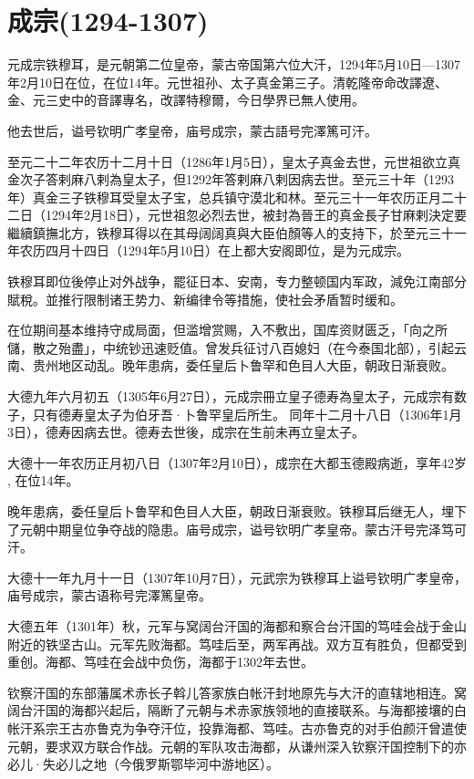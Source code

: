 
\section{成宗\tiny(1294-1307)}

元成宗铁穆耳，是元朝第二位皇帝，蒙古帝国第六位大汗，1294年5月10日—1307年2月10日在位，在位14年。元世祖孙、太子真金第三子。清乾隆帝命改譯遼、金、元三史中的音譯專名，改譯特穆爾，今日學界已無人使用。

他去世后，谥号钦明广孝皇帝，庙号成宗，蒙古語号完澤篤可汗。

至元二十二年农历十二月十日（1286年1月5日），皇太子真金去世，元世祖欲立真金次子答剌麻八剌為皇太子，但1292年答剌麻八剌因病去世。至元三十年（1293年）真金三子铁穆耳受皇太子宝，总兵镇守漠北和林。至元三十一年农历正月二十二日（1294年2月18日），元世祖忽必烈去世，被封為晉王的真金長子甘麻剌決定要繼續鎮撫北方，铁穆耳得以在其母阔阔真與大臣伯顏等人的支持下，於至元三十一年农历四月十四日（1294年5月10日）在上都大安阁即位，是为元成宗。

铁穆耳即位後停止对外战争，罷征日本、安南，专力整顿国内军政，減免江南部分賦稅。並推行限制诸王势力、新编律令等措施，使社会矛盾暂时缓和。

在位期间基本维持守成局面，但滥增赏赐，入不敷出，国库资财匮乏，「向之所儲，散之殆盡」，中统钞迅速贬值。曾发兵征讨八百媳妇（在今泰国北部），引起云南、贵州地区动乱。晚年患病，委任皇后卜鲁罕和色目人大臣，朝政日渐衰败。

大德九年六月初五（1305年6月27日），元成宗冊立皇子德寿為皇太子，元成宗有数子，只有德寿皇太子为伯牙吾·卜鲁罕皇后所生。 同年十二月十八日（1306年1月3日），德寿因病去世。德寿去世後，成宗在生前未再立皇太子。

大德十一年农历正月初八日（1307年2月10日），成宗在大都玉德殿病逝，享年42岁 , 在位14年。

晚年患病，委任皇后卜鲁罕和色目人大臣，朝政日渐衰败。铁穆耳后继无人，埋下了元朝中期皇位争夺战的隐患。庙号成宗，谥号钦明广孝皇帝。蒙古汗号完泽笃可汗。

大德十一年九月十一日（1307年10月7日），元武宗为铁穆耳上谥号钦明广孝皇帝，庙号成宗，蒙古语称号完澤篤皇帝。

大德五年（1301年）秋，元军与窝阔台汗国的海都和察合台汗国的笃哇会战于金山附近的铁坚古山。元军先败海都。笃哇后至，两军再战。双方互有胜负，但都受到重创。海都、笃哇在会战中负伤，海都于1302年去世。

钦察汗国的东部藩属术赤长子斡儿答家族白帐汗封地原先与大汗的直辖地相连。窝阔台汗国的海都兴起后，隔断了元朝与术赤家族领地的直接联系。与海都接壤的白帐汗系宗王古亦鲁克为争夺汗位，投靠海都、笃哇。古亦鲁克的对手伯颜汗曾遣使元朝，要求双方联合作战。元朝的军队攻击海都，从谦州深入钦察汗国控制下的亦必儿·失必儿之地（今俄罗斯鄂毕河中游地区）。

